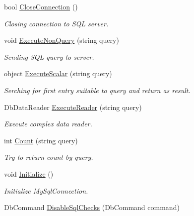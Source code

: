 \begin{DoxyCompactItemize}
bool \mbox{\hyperlink{class_uniform_data_operator_1_1_sql_1_1_my_sql_1_1_my_sql_data_operator_ae096306ef55611afbe96b0017f2032f6}{Close\+Connection}} ()
\begin{DoxyCompactList}\small\item\em Closing connection to S\+QL server. \end{DoxyCompactList}\item 
void \mbox{\hyperlink{class_uniform_data_operator_1_1_sql_1_1_my_sql_1_1_my_sql_data_operator_a2ae34bb488958f927723a66914e56a0b}{Execute\+Non\+Query}} (string query)
\begin{DoxyCompactList}\small\item\em Sending S\+QL query to server. \end{DoxyCompactList}\item 
object \mbox{\hyperlink{class_uniform_data_operator_1_1_sql_1_1_my_sql_1_1_my_sql_data_operator_a5d6645ebf8d909cb553dbdf6ab7e9b29}{Execute\+Scalar}} (string query)
\begin{DoxyCompactList}\small\item\em Serching for first entry suitable to query and return as result. \end{DoxyCompactList}\item 
Db\+Data\+Reader \mbox{\hyperlink{class_uniform_data_operator_1_1_sql_1_1_my_sql_1_1_my_sql_data_operator_af268707ebe1917b32e450fb0f50e717d}{Execute\+Reader}} (string query)
\begin{DoxyCompactList}\small\item\em Execute complex data reader. \end{DoxyCompactList}\item 
int \mbox{\hyperlink{class_uniform_data_operator_1_1_sql_1_1_my_sql_1_1_my_sql_data_operator_acf051b5431ee10337b9ab6bc6184d4db}{Count}} (string query)
\begin{DoxyCompactList}\small\item\em Try to return count by query. \end{DoxyCompactList}\item 
void \mbox{\hyperlink{class_uniform_data_operator_1_1_sql_1_1_my_sql_1_1_my_sql_data_operator_a5aad834d2ceba598037b6ed19b27db6d}{Initialize}} ()
\begin{DoxyCompactList}\small\item\em Initialize My\+Sql\+Connection. \end{DoxyCompactList}\item 
Db\+Command \mbox{\hyperlink{class_uniform_data_operator_1_1_sql_1_1_my_sql_1_1_my_sql_data_operator_affbacb4fb1773fc14cdbb9cbcd315c5f}{Disable\+Sql\+Checks}} (Db\+Command command)

\end{DoxyCompactItemize}
